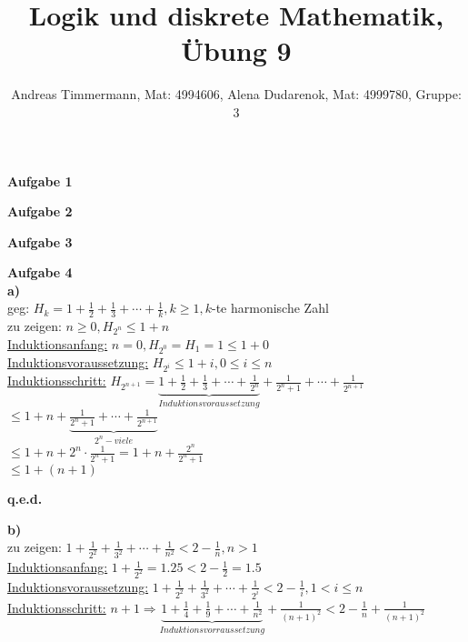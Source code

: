 \documentclass[a4paper]{scrartcl}
\title{Logik und diskrete Mathematik, Übung 9}
\author{Andreas Timmermann, Mat: 4994606, Alena Dudarenok, Mat: 4999780, Gruppe: 3}
\begin{document}
	\maketitle
	\begin{flushleft}
		\textbf{Aufgabe 1}\\
	\end{flushleft}
	\begin{flushleft}
		\textbf{Aufgabe 2}\\
	\end{flushleft}
	\begin{flushleft}
		\textbf{Aufgabe 3}\\
	\end{flushleft}
	\begin{flushleft}
		\textbf{Aufgabe 4}\\
		\textbf{a)}\\
		geg: $H_k=1+\frac{1}{2}+\frac{1}{3}+\cdots +\frac{1}{k}, k\ge 1, k$-te harmonische Zahl\\
		zu zeigen: $n\ge 0, H_{2^n}\le 1+n$\\[1em]
		\underline{Induktionsanfang:} $n=0, H_{2^0} = H_{1} = 1\le 1 + 0$\\ 
		\underline{Induktionsvoraussetzung:} $H_{2^i}\le 1+i, 0\le i \le n$\\
		\underline{Induktionsschritt:} $H_{2^{n+1}}= \underbrace{1+\frac{1}{2}+\frac{1}{3}+\cdots +\frac{1}{2^n}}_{Induktionsvoraussetzung}+\frac{1}{2^n+1}+\cdots +\frac{1}{2^{n+1}}$\\
		$\le 1+n+\underbrace{\frac{1}{2^n+1}+\cdots +\frac{1}{2^{n+1}}}_{2^n-viele}$\\
		$\le 1+n+2^n\cdot \frac{1}{2^n+1} = 1+n+\frac{2^n}{2^n+1}$\\
		$\le 1+(n+1)$\\
		\begin{center}
		\textbf{q.e.d.}\\
		\end{center}
		\textbf{b)}\\
		zu zeigen: $1+\frac{1}{2^2}+\frac{1}{3^2}+\cdots +\frac{1}{n^2} < 2-\frac{1}{n}, n>1$\\
		\underline{Induktionsanfang:} $1+\frac{1}{2^2} = 1.25 < 2 - \frac{1}{2} = 1.5$\\
		\underline{Induktionsvoraussetzung:} $1+\frac{1}{2^2}+\frac{1}{3^2}+\cdots +\frac{1}{2^i} < 2-\frac{1}{i}, 1< i \le n$\\
		\underline{Induktionsschritt:} $n+1 \Rightarrow \underbrace{1+\frac{1}{4}+\frac{1}{9}+\cdots +\frac{1}{n^2}}_{Induktionsvorraussetzung}+\frac{1}{(n+1)^2}< 2-\frac{1}{n}+\frac{1}{(n+1)^2}$\\[1em]

\end{flushleft}
\end{document}
